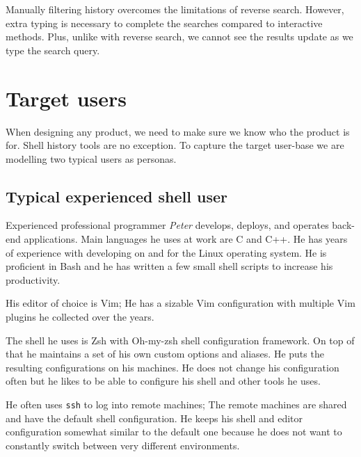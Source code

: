 Manually filtering history overcomes the limitations of reverse search. However, extra typing is necessary to complete the searches compared to interactive methods. Plus, unlike with reverse search, we cannot see the results update as we type the search query.


\section{Target users}

When designing any product, we need to make sure we know who the product is for. Shell history tools are no exception. To capture the target user-base we are modelling two typical users as personas.%

\subsection{Typical experienced shell user}

Experienced professional programmer \textit{Peter} develops, deploys, and operates back-end applications. Main languages he uses at work are C and C++. He has years of experience with developing on and for the Linux operating system. He is proficient in Bash and he has written a few small shell scripts to increase his productivity.

His editor of choice is Vim; He has a sizable Vim configuration with multiple Vim plugins he collected over the years.

The shell he uses is Zsh with Oh-my-zsh \cite{toolsohmyzsh} shell configuration framework. On top of that he maintains a set of his own custom options and aliases. He puts the resulting configurations on his machines. He does not change his configuration often but he likes to be able to configure his shell and other tools he uses.

He often uses \verb|ssh| to log into remote machines; The remote machines are shared and have the default shell configuration. He keeps his shell and editor configuration somewhat similar to the default one because he does not want to constantly switch between very different environments. 

